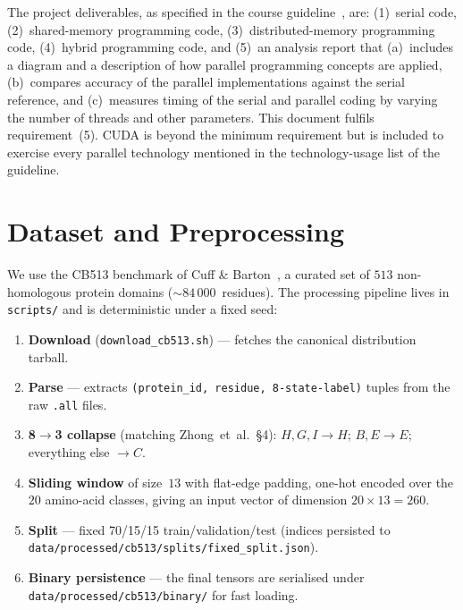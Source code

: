 \documentclass[11pt,a4paper]{article}
\begin{document}
The project deliverables, as specified in the course
guideline~\cite{guideline}, are: (1)~serial code, (2)~shared-memory
programming code, (3)~distributed-memory programming code, (4)~hybrid
programming code, and (5)~an analysis report that (a)~includes a diagram
and a description of how parallel programming concepts are applied,
(b)~compares accuracy of the parallel implementations against the serial
reference, and (c)~measures timing of the serial and parallel coding by
varying the number of threads and other parameters. This document fulfils
requirement~(5). CUDA is beyond the minimum requirement but is included to
exercise every parallel technology mentioned in the technology-usage list
of the guideline.

\section{Dataset and Preprocessing}\label{sec:data}

We use the CB513 benchmark of Cuff \& Barton~\cite{cuff1999}, a curated
set of $513$ non-homologous protein domains (${\sim}84\,000$~residues). The
processing pipeline lives in \texttt{scripts/} and is deterministic under a
fixed seed:

\begin{enumerate}[noitemsep,topsep=2pt]
  \item \textbf{Download} (\texttt{download\_cb513.sh}) --- fetches the
        canonical distribution tarball.
  \item \textbf{Parse} --- extracts \texttt{(protein\_id, residue,
        8-state-label)} tuples from the raw \texttt{.all} files.
  \item \textbf{8$\to$3 collapse} (matching Zhong~et~al.\ §4):
        \(H,G,I \to H\); \(B,E \to E\); everything else $\to C$.
  \item \textbf{Sliding window} of size~$13$ with flat-edge padding,
        one-hot encoded over the $20$ amino-acid classes, giving an
        input vector of dimension \(20 \times 13 = 260\).
  \item \textbf{Split} --- fixed 70/15/15 train/validation/test (indices
        persisted to \texttt{data/processed/cb513/splits/fixed\_split.json}).
  \item \textbf{Binary persistence} --- the final tensors are serialised
        under \texttt{data/processed/cb513/binary/} for fast loading.
\end{enumerate}
\end{document}
